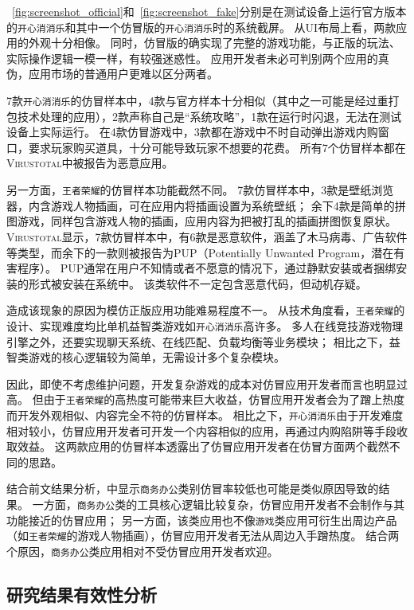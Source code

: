 ~\autoref{fig:screenshot_official}和~\autoref{fig:screenshot_fake}分别是在测试设备上运行官方版本的\texttt{开心消消乐}和其中一个仿冒版的\texttt{开心消消乐}时的系统截屏。
从UI布局上看，两款应用的外观十分相像。
同时，仿冒版的确实现了完整的游戏功能，与正版的玩法、实际操作逻辑一模一样，有较强迷惑性。
应用开发者未必可判别两个应用的真伪，应用市场的普通用户更难以区分两者。

7款\texttt{开心消消乐}的仿冒样本中，4款与官方样本十分相似（其中之一可能是经过重打包技术处理的应用），2款声称自己是``系统攻略''，1款在运行时闪退，无法在测试设备上实际运行。
在4款仿冒游戏中，3款都在游戏中不时自动弹出游戏内购窗口，要求玩家购买道具，十分可能导致玩家不想要的花费。
所有7个仿冒样本都在\textsc{Virustotal}中被报告为恶意应用。

另一方面，\texttt{王者荣耀}的仿冒样本功能截然不同。
7款仿冒样本中，3款是壁纸浏览器，内含游戏人物插画，可在应用内将插画设置为系统壁纸；
余下4款是简单的拼图游戏，同样包含游戏人物的插画，应用内容为把被打乱的插画拼图恢复原状。
\textsc{Virustotal}显示，7款仿冒样本中，有6款是恶意软件，涵盖了木马病毒、广告软件等类型，而余下的一款则被报告为PUP（Potentially Unwanted Program，潜在有害程序）。
PUP通常在用户不知情或者不愿意的情况下，通过静默安装或者捆绑安装的形式被安装在系统中。
该类软件不一定包含恶意代码，但动机存疑。

造成该现象的原因为模仿正版应用功能难易程度不一。
从技术角度看，\texttt{王者荣耀}的设计、实现难度均比单机益智类游戏如\texttt{开心消消乐}高许多。
多人在线竞技游戏物理引擎之外，还要实现聊天系统、在线匹配、负载均衡等业务模块；
相比之下，益智类游戏的核心逻辑较为简单，无需设计多个复杂模块。

因此，即使不考虑维护问题，开发复杂游戏的成本对仿冒应用开发者而言也明显过高。
但由于\texttt{王者荣耀}的高热度可能带来巨大收益，仿冒应用开发者会为了蹭上热度而开发外观相似、内容完全不符的仿冒样本。
相比之下，\texttt{开心消消乐}由于开发难度相对较小，仿冒应用开发者可开发一个内容相似的应用，再通过内购陷阱等手段收取效益。
这两款应用的仿冒样本透露出了仿冒应用开发者在仿冒方面两个截然不同的思路。

结合前文结果分析，中显示\texttt{商务办公}类别仿冒率较低也可能是类似原因导致的结果。
一方面，\texttt{商务办公}类的工具核心逻辑比较复杂，仿冒应用开发者不会制作与其功能接近的仿冒应用；
另一方面，该类应用也不像\texttt{游戏}类应用可衍生出周边产品（如\texttt{王者荣耀}的游戏人物插画），仿冒应用开发者无法从周边入手蹭热度。
结合两个原因，\texttt{商务办公}类应用相对不受仿冒应用开发者欢迎。

\subsection{研究结果有效性分析}

